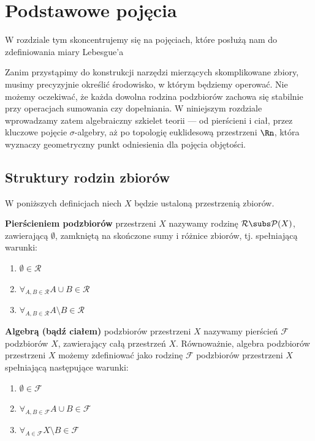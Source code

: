 \section{Podstawowe pojęcia}
W rozdziale tym skoncentrujemy się na pojęciach, które posłużą nam do zdefiniowania miary Lebesgue'a

Zanim przystąpimy do konstrukcji narzędzi mierzących skomplikowane zbiory, musimy precyzyjnie określić środowisko, w którym będziemy operować. Nie możemy oczekiwać, że każda dowolna rodzina podzbiorów zachowa się stabilnie przy operacjach sumowania czy dopełniania. W niniejszym rozdziale wprowadzamy zatem algebraiczny szkielet teorii — od pierścieni i ciał, przez kluczowe pojęcie $\sigma$-algebry, aż po topologię euklidesową przestrzeni $\Rn$, która wyznaczy geometryczny punkt odniesienia dla pojęcia objętości.

\subsection{Struktury rodzin zbiorów}
W poniższych definicjach niech $X$ będzie ustaloną przestrzenią zbiorów.
\begin{defi}
    \textbf{Pierścieniem podzbiorów} przestrzeni $X$ nazywamy rodzinę $\mathcal{R} \subs \mathcal{P}(X)$, zawierającą $\emptyset$, zamkniętą na skończone sumy i różnice zbiorów, tj. spełniającą warunki:
    \begin{enumerate}
        \item $\emptyset \in \mathcal{R}$
        \item $\forall_{A, B \in \mathcal{R}} A \cup B \in \mathcal{R}$
        \item $\forall_{A, B \in \mathcal{R}} A \setminus B \in \mathcal{R}$
    \end{enumerate}
\end{defi}

\begin{defi}
    \textbf{Algebrą (bądź ciałem)} podzbiorów przestrzeni $X$  nazywamy pierścień $\mathcal{F}$ podzbiorów $X$, zawierający całą przestrzeń $X$. Równoważnie, algebra podzbiorów przestrzeni $X$ możemy zdefiniować jako rodzinę $\mathcal{F}$ podzbiorów przestrzeni $X$ spełniającą następujące warunki:
    \begin{enumerate}
        \item $\emptyset \in \mathcal{F}$
        \item $\forall_{A,B \in \mathcal{F}} A \cup B \in \mathcal{F}$
        \item $\forall_{A \in \mathcal{F}} X \setminus B \in \mathcal{F}$
    \end{enumerate}
\end{defi}

